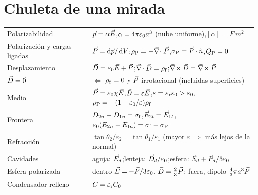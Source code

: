 \section{Chuleta de una mirada}\label{rsec:chuleta}

\begin{center}
\small
\renewcommand{\arraystretch}{1.45}
\begin{tabularx}{\textwidth}{@{}>{\raggedright\arraybackslash}p{4.2cm}>{\raggedright\arraybackslash}X@{}}
\toprule
Polarizabilidad & $\vec p=\alpha\vec E$,\quad $\alpha=4\pi\varepsilon_0 a^3$ (nube uniforme),\quad $[\alpha]=\si{F\,m^2}$\\
Polarización y cargas ligadas & $\vec P=\mathop{}\!\mathrm{d}\vec p/\mathop{}\!\mathrm{d} V$;\quad $\rho_{\mathrm P}=-\vec\nabla\!\cdot\vec P$,\quad $\sigma_{\mathrm P}=\vec P\cdot\hat n$,\quad $Q_{\mathrm P}=0$\\
Desplazamiento & $\vec D=\varepsilon_0\vec E+\vec P$;\quad $\vec\nabla\!\cdot\vec D=\rho_{\mathrm f}$;\quad $\vec\nabla\!\times\vec D=\vec\nabla\!\times\vec P$\\
$\vec D=\vec 0$ & $\Leftrightarrow$ $\rho_{\mathrm f}=0$ y $\vec P$ irrotacional (incluidas superficies)\\
Medio \LHI{} & $\vec P=\varepsilon_0\chi\vec E$,\quad $\vec D=\varepsilon\vec E$,\quad $\varepsilon=\varepsilon_{\mathrm r}\varepsilon_0>\varepsilon_0$,\quad $\rho_{\mathrm P}=-(1-\varepsilon_0/\varepsilon)\rho_{\mathrm f}$\\
Frontera & $D_{2n}-D_{1n}=\sigma_{\mathrm f}$,\quad $\vec E_{2t}=\vec E_{1t}$,\quad $\varepsilon_0(E_{2n}-E_{1n})=\sigma_{\mathrm f}+\sigma_{\mathrm P}$\\
Refracción & $\tan\theta_2/\varepsilon_2=\tan\theta_1/\varepsilon_1$ (mayor $\varepsilon$ $\Rightarrow$ más lejos de la normal)\\
Cavidades & aguja: $\vec E_d$;\quad lenteja: $\vec D_d/\varepsilon_0$;\quad esfera: $\vec E_d+\vec P_d/3\varepsilon_0$\\
Esfera polarizada & dentro $\vec E=-\vec P/3\varepsilon_0$, $\vec D=\tfrac23\vec P$; fuera, dipolo $\tfrac43\pi a^3\vec P$\\
Condensador relleno & $C=\varepsilon_{\mathrm r} C_0$\\
\bottomrule
\end{tabularx}
\end{center}
